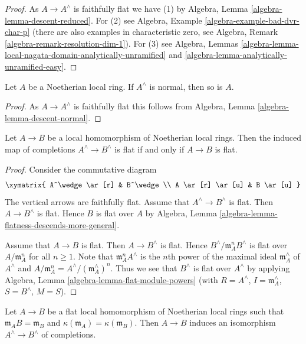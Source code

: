 \begin{proof}
As $A \to A^\wedge$ is faithfully flat we have (1) by
Algebra, Lemma \ref{algebra-lemma-descent-reduced}.
For (2) see Algebra, Example \ref{algebra-example-bad-dvr-char-p}
(there are also examples in characteristic zero, see
Algebra, Remark \ref{algebra-remark-resolution-dim-1}).
For (3) see Algebra, Lemmas
\ref{algebra-lemma-local-nagata-domain-analytically-unramified} and
\ref{algebra-lemma-analytically-unramified-easy}.
\end{proof}

\begin{lemma}
\label{lemma-completion-normal}
Let $A$ be a Noetherian local ring. If $A^\wedge$ is normal, then so is $A$.
\end{lemma}

\begin{proof}
As $A \to A^\wedge$ is faithfully flat this follows from
Algebra, Lemma \ref{algebra-lemma-descent-normal}.
\end{proof}

\begin{lemma}
\label{lemma-flat-completion}
Let $A \to B$ be a local homomorphism of Noetherian local rings.
Then the induced map of completions $A^\wedge \to B^\wedge$
is flat if and only if $A \to B$ is flat.
\end{lemma}

\begin{proof}
Consider the commutative diagram
$$
\xymatrix{
A^\wedge \ar[r] & B^\wedge \\
A \ar[r] \ar[u] & B \ar[u]
}
$$
The vertical arrows are faithfully flat.
Assume that $A^\wedge \to B^\wedge$ is flat. Then $A \to B^\wedge$ is flat.
Hence $B$ is flat over $A$ by
Algebra, Lemma \ref{algebra-lemma-flatness-descends-more-general}.

\medskip\noindent
Assume that $A \to B$ is flat. Then $A \to B^\wedge$ is flat.
Hence $B^\wedge/\mathfrak m_A^n B^\wedge$ is flat over
$A/\mathfrak m_A^n$ for all $n \geq 1$. Note that
$\mathfrak m_A^n A^\wedge$ is the $n$th power of
the maximal ideal $\mathfrak m_A^\wedge$ of $A^\wedge$ and
$A/\mathfrak m_A^n = A^\wedge/(\mathfrak m_A^\wedge)^n$.
Thus we see that $B^\wedge$ is flat over $A^\wedge$ by applying
Algebra, Lemma \ref{algebra-lemma-flat-module-powers}
(with $R = A^\wedge$, $I = \mathfrak m_A^\wedge$,
$S = B^\wedge$, $M = S$).
\end{proof}

\begin{lemma}
\label{lemma-flat-unramified}
Let $A \to B$ be a flat local homomorphism of Noetherian local rings
such that $\mathfrak m_A B = \mathfrak m_B$ and
$\kappa(\mathfrak m_A) = \kappa(\mathfrak m_B)$.
Then $A \to B$ induces an isomorphism $A^\wedge \to B^\wedge$
of completions.
\end{lemma}

